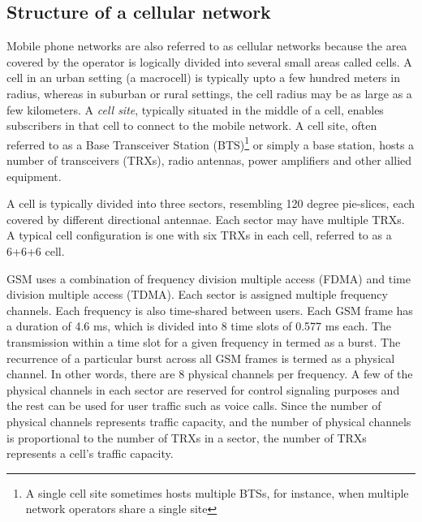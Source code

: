 \subsection{Structure of a cellular network} %
Mobile phone networks are also referred to as cellular networks because the area covered by the operator is logically divided into several small areas called cells. A cell in an urban setting (a macrocell) is typically upto a few hundred meters in radius, whereas in suburban or rural settings, the cell radius may be as large as a few kilometers. A \textit{cell site}, typically situated in the middle of a cell, enables subscribers in that cell to connect to the mobile network. A cell site, often referred to as a Base Transceiver Station (BTS)\footnote{A single cell site sometimes hosts multiple BTSs, for instance, when multiple network operators share a single site} or simply a base station, hosts a number of transceivers (TRXs), radio antennas, power amplifiers and other allied equipment. 

A cell is typically divided into three sectors, resembling 120 degree pie-slices, each covered by different directional antennae. Each sector may have multiple TRXs. A typical cell configuration is one with six TRXs in each cell, referred to as a 6+6+6 cell. 

GSM uses a combination of frequency division multiple access (FDMA) and time division multiple access (TDMA). Each sector is assigned multiple frequency channels. Each frequency is also time-shared between users. Each GSM frame has a duration of 4.6 ms, which is divided into 8 time slots of 0.577 ms each. The transmission within a time slot for a given frequency in termed as a burst. The recurrence of a particular burst across all GSM frames is termed as a physical channel. In other words, there are 8 physical channels per frequency. A few of the physical channels in each sector are reserved for control signaling purposes and the rest can be used for user traffic such as voice calls. Since the number of physical channels represents traffic capacity, and the number of physical channels is proportional to the number of TRXs in a sector, the number of TRXs represents a cell's traffic capacity.


